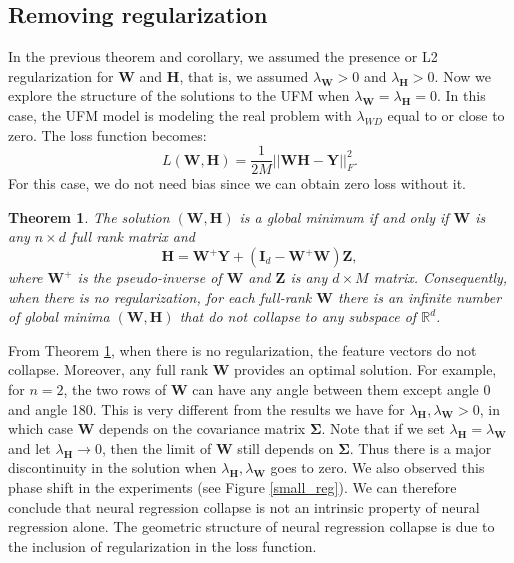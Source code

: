 \documentclass{article}
\theoremstyle{plain}
\newtheorem{theorem}{Theorem}[section]
\theoremstyle{definition}
\theoremstyle{remark}
\newcommand{\bW}{{\mathbf W}}
\newcommand{\bY}{{\mathbf Y}}
\newcommand{\bH}{{\mathbf H}}
\newcommand{\bI}{{\mathbf I}}
\newcommand{\bZ}{{\mathbf Z}}
\newcommand{\bSigma}{{\mathbf \Sigma}}
\newcommand{\lH}{\lambda_{\bH}}
\newcommand{\lW}{\lambda_{\bW}}
\newcommand{\Rd}{\mathbb{R}^d}
\begin{document}
\subsection{Removing regularization}
In the previous theorem and corollary, we assumed the presence or L2 regularization for $\bW$ and $\bH$, that is, we assumed $\lW >0$ and $\lH >0$. Now we explore the structure of the solutions to the UFM when $\lW = \lH = 0$.  In this case, the UFM model is modeling the real problem with $\lambda_{WD}$ equal to or close to zero. The loss function becomes:
\begin{equation}
L(\bW,\bH) = \frac{1}{2M} || \bW \bH - \bY ||_F^2.
\end{equation}
For this case, we do not need bias since we can obtain zero loss without it. 
\begin{theorem} \label{no_regularization}
    The solution $(\bW,\bH)$ is a global minimum if and only if $\bW$ is any $n \times d$ full rank matrix and 
    \begin{equation} \label{noreg}
        \bH = \bW^+ \bY + (\bI_d - \bW^+\bW)\bZ,
    \end{equation}
where $\bW^+$ is the pseudo-inverse of $\bW$ and $\bZ$ is any $d \times M$ matrix.
Consequently, when there is no regularization, for each full-rank $\bW$
there is an infinite number of global minima $(\bW,\bH)$ that do not collapse to any subspace of $\Rd$.
\end{theorem}
From Theorem \ref{no_regularization}, when there is no regularization, the feature vectors do not collapse. Moreover,  
any full rank $\bW$ provides an optimal solution. For example, for $n=2$, the two rows of $\bW$ can have any angle between them except angle 0 and angle 180. 
This is very different from the results we have for $\lH, \lW > 0$, in which case $\bW$ depends on the covariance matrix $\bSigma$.
Note that if we set $\lH =\lW$ and let $\lH \rightarrow 0$, then the limit of $\bW$ still depends on $\bSigma$.
Thus there is a major discontinuity in the solution when $\lH, \lW$ goes to zero. We also observed this phase shift in the experiments (see Figure \ref{small_reg}).
We can therefore conclude that neural regression collapse is not an intrinsic property of neural regression alone. The geometric structure of neural regression collapse is due to the inclusion of regularization in the loss function.
\end{document}
